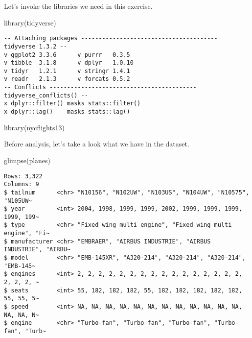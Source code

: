 \documentclass[
  letterpaper,
  DIV=11,
  numbers=noendperiod]{scrreprt}
\newenvironment{Shaded}{\begin{snugshade}}{\end{snugshade}}
\newcommand{\FunctionTok}[1]{\textcolor[rgb]{0.28,0.35,0.67}{#1}}
\newcommand{\NormalTok}[1]{\textcolor[rgb]{0.00,0.23,0.31}{#1}}
\begin{document}
\hfill\break

Let's invoke the libraries we need in this exercise.

\begin{Shaded}
\begin{Highlighting}[]
\FunctionTok{library}\NormalTok{(tidyverse)}
\end{Highlighting}
\end{Shaded}

\begin{verbatim}
-- Attaching packages --------------------------------------- tidyverse 1.3.2 --
v ggplot2 3.3.6      v purrr   0.3.5 
v tibble  3.1.8      v dplyr   1.0.10
v tidyr   1.2.1      v stringr 1.4.1 
v readr   2.1.3      v forcats 0.5.2 
-- Conflicts ------------------------------------------ tidyverse_conflicts() --
x dplyr::filter() masks stats::filter()
x dplyr::lag()    masks stats::lag()
\end{verbatim}

\begin{Shaded}
\begin{Highlighting}[]
\FunctionTok{library}\NormalTok{(nycflights13)}
\end{Highlighting}
\end{Shaded}

Before analysis, let's take a look what we have in the dataset.

\begin{Shaded}
\begin{Highlighting}[]
\FunctionTok{glimpse}\NormalTok{(planes)}
\end{Highlighting}
\end{Shaded}

\begin{verbatim}
Rows: 3,322
Columns: 9
$ tailnum      <chr> "N10156", "N102UW", "N103US", "N104UW", "N10575", "N105UW~
$ year         <int> 2004, 1998, 1999, 1999, 2002, 1999, 1999, 1999, 1999, 199~
$ type         <chr> "Fixed wing multi engine", "Fixed wing multi engine", "Fi~
$ manufacturer <chr> "EMBRAER", "AIRBUS INDUSTRIE", "AIRBUS INDUSTRIE", "AIRBU~
$ model        <chr> "EMB-145XR", "A320-214", "A320-214", "A320-214", "EMB-145~
$ engines      <int> 2, 2, 2, 2, 2, 2, 2, 2, 2, 2, 2, 2, 2, 2, 2, 2, 2, 2, 2, ~
$ seats        <int> 55, 182, 182, 182, 55, 182, 182, 182, 182, 182, 55, 55, 5~
$ speed        <int> NA, NA, NA, NA, NA, NA, NA, NA, NA, NA, NA, NA, NA, NA, N~
$ engine       <chr> "Turbo-fan", "Turbo-fan", "Turbo-fan", "Turbo-fan", "Turb~
\end{verbatim}
\end{document}
